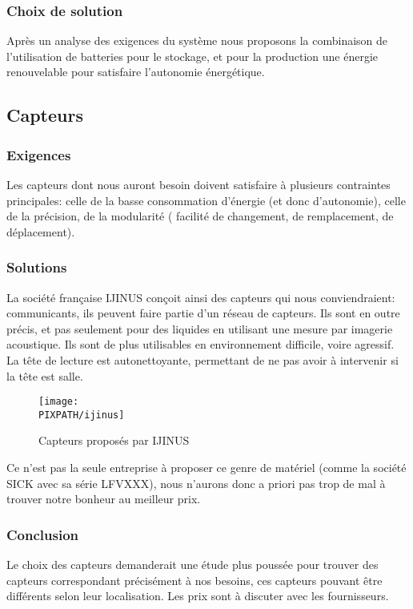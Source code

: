 \subsubsection{Choix de solution}
Après un analyse des exigences du syst\`eme nous proposons la combinaison de l'utilisation de batteries pour le stockage, et pour la production une \'{e}nergie renouvelable pour satisfaire l'autonomie \'{e}nerg\'{e}tique.

\subsection{Capteurs}

    \subsubsection{Exigences}
    Les capteurs dont nous auront besoin doivent satisfaire à plusieurs
    contraintes principales: celle de la basse consommation d'énergie
    (et donc d'autonomie), celle de la précision, de la modularité (
    facilité de changement, de remplacement, de déplacement).

    \subsubsection{Solutions}
    La société française IJINUS conçoit ainsi des capteurs qui nous
    conviendraient: communicants, ils peuvent faire partie d'un
    réseau de capteurs. Ils sont en outre précis, et pas seulement
    pour des liquides en utilisant une mesure par imagerie acoustique.
    Ils sont de plus utilisables en environnement difficile, voire agressif.
    La tête de lecture est autonettoyante, permettant de ne pas avoir
    à intervenir si la tête est salle.

    \begin{figure}[!h]
    \begin{center}

    \texttt{[image: \\PIXPATH/ijinus]}
    \caption{Capteurs proposés par IJINUS}
    \end{center}
    \end{figure}

    Ce n'est pas la seule entreprise à proposer ce genre de matériel (comme la société SICK avec sa série LFVXXX), nous
    n'aurons donc a priori pas trop de mal à trouver notre bonheur au meilleur
    prix.

    \subsubsection{Conclusion}
    Le choix des capteurs demanderait une étude plus poussée
    pour trouver des capteurs correspondant précisément à nos besoins,
    ces capteurs pouvant être différents selon leur localisation.
    Les prix sont à discuter avec les fournisseurs.


